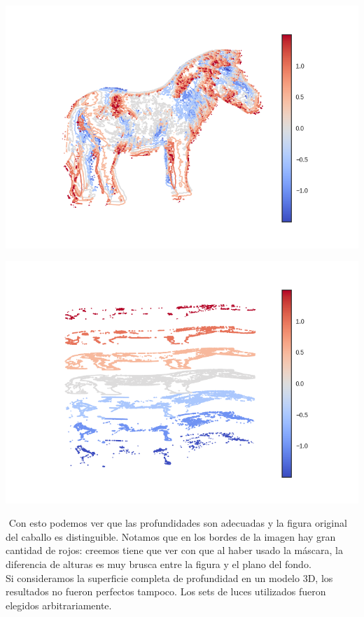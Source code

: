 {\centering
    \includegraphics[width=0.80\linewidth]{informe/imagenes/supnivel/supNivelCaballoLucesPropias578N1.png}
}

{\centering
    \includegraphics[width=0.80\linewidth]{informe/imagenes/supnivel/supNivelCaballoLucesPropias578N3.png}
}

$ $\newline
Con esto podemos ver que las profundidades son adecuadas y la figura original del caballo es distinguible. Notamos que en los bordes de la imagen hay gran cantidad de rojos: creemos tiene que ver con que al haber usado la máscara, la diferencia de alturas es muy brusca entre la figura y el plano del fondo.  \\

Si consideramos la superficie completa de profundidad en un modelo 3D, los resultados no fueron perfectos tampoco. Los sets de luces utilizados fueron elegidos arbitrariamente. \\

